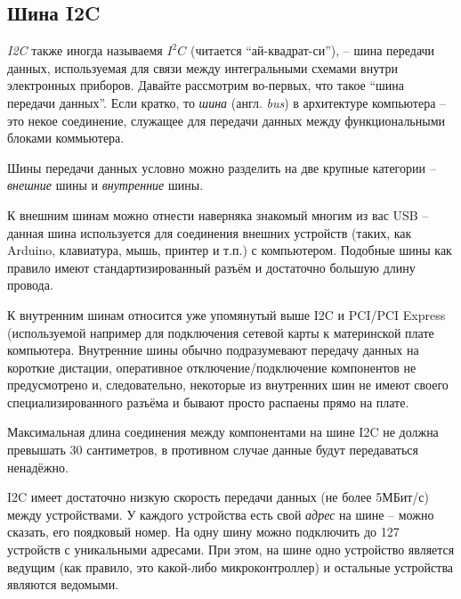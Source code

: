 \documentclass[../sparc.tex]{subfiles}
\begin{document}
\subsection{Шина I2C}
\label{section:i2c}




\textit{\gls{I2C}} также иногда называемя $I^{2}C$ (читается ``ай-квадрат-си''),
-- шина передачи данных, используемая для связи между интегральными схемами
внутри электронных приборов. Давайте рассмотрим во-первых, что такое ``шина
передачи данных''. Если кратко, то \textit{шина} (англ. \textit{bus}) в
архитектуре компьютера -- это некое соединение, служащее для передачи данных
между функциональными блоками коммьютера.

Шины передачи данных условно можно разделить на две крупные категории --
\textit{внешние} шины и \textit{внутренние} шины.

К внешним шинам можно отнести наверняка знакомый многим из вас \gls{USB} --
данная шина используется для соединения внешних устройств (таких, как Arduino,
клавиатура, мышь, принтер и т.п.) с компьютером.  Подобные шины как правило
имеют стандартизированный разъём и достаточно большую длину провода.

К внутренним шинам относится уже упомянутый выше \gls{I2C} и \gls{PCI}/PCI
Express (используемой например для подключения сетевой карты к материнской плате
компьютера.  Внутренние шины обычно подразумевают передачу данных на короткие
дистации, оперативное отключение/подключение компонентов не предусмотрено и,
следовательно, некоторые из внутренних шин не имеют своего специализированного
разъёма и бывают просто распаены прямо на плате.

Максимальная длина соединения между компонентами на шине \gls{I2C} не должна
превышать 30 сантиметров, в противном случае данные будут передаваться
ненадёжно.

\gls{I2C} имеет достаточно низкую скорость передачи данных (не более 5МБит/с)
между устройствами. У каждого устройства есть свой \textit{адрес} на шине --
можно сказать, его поядковый номер. На одну шину можно подключить до 127
устройств с уникальными адресами. При этом, на шине одно устройство является
ведущим (как правило, это какой-либо микроконтроллер) и остальные устройства
являются ведомыми.
\end{document}
